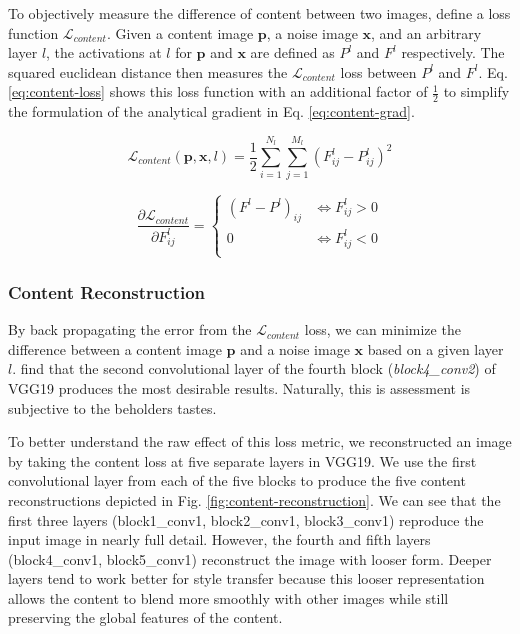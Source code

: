 \documentclass{article}
\begin{document}
To objectively measure the difference of content between two images,
\cite{2015arXiv150806576G} define a loss function $\mathcal{L}_{content}$.
Given a content image $\textbf{p}$, a noise image $\textbf{x}$, and an
arbitrary layer $l$, the activations at $l$ for $\textbf{p}$ and $\textbf{x}$
are defined as $P^l$ and $F^l$ respectively. The squared euclidean distance
then measures the $\mathcal{L}_{content}$ loss between $P^l$ and $F^l$. Eq.
\ref{eq:content-loss} shows this loss function with an additional factor of
$\frac{1}{2}$ to simplify the formulation of the analytical gradient in Eq.
\ref{eq:content-grad}.

\begin{equation}
\label{eq:content-loss}
\mathcal{L}_{content}(\mathbf{p}, \mathbf{x}, l) =
\frac{1}{2} \sum_{i=1}^{N_l}\sum_{j=1}^{M_l}{(F^l_{ij} - P^l_{ij})^2}
\end{equation}

\begin{equation}
\label{eq:content-grad}
\frac{\partial \mathcal{L}_{content}}{\partial F^l_{ij}} =
\begin{cases}
    (F^l - P^l)_{ij} & \iff F^l_{ij} > 0 \\
    0 & \iff F^l_{ij} < 0 \\
\end{cases}
\end{equation}

\subsubsection{Content Reconstruction}

By back propagating the error from the $\mathcal{L}_{content}$ loss, we can
minimize the difference between a content image $\textbf{p}$ and a noise image
$\textbf{x}$ based on a given layer $l$. \cite{2015arXiv150806576G} find that
the second convolutional layer of the fourth block (\textit{block4\_conv2}) of
VGG19 produces the most desirable results.
Naturally, this is assessment is subjective to the beholders tastes.

To better understand the raw effect of this loss metric, we reconstructed an
image by taking the content loss at five separate layers in VGG19. We use the
first convolutional layer from each of the five blocks to produce the five
content reconstructions depicted in Fig. \ref{fig:content-reconstruction}. We
can see that the first three layers (block1\_conv1, block2\_conv1,
block3\_conv1) reproduce the input image in nearly full detail. However, the
fourth and fifth layers (block4\_conv1, block5\_conv1) reconstruct the image
with looser form. Deeper layers tend to work better for style transfer because
this looser representation allows the content to blend more smoothly with
other images while still preserving the global features of the content.
\end{document}
